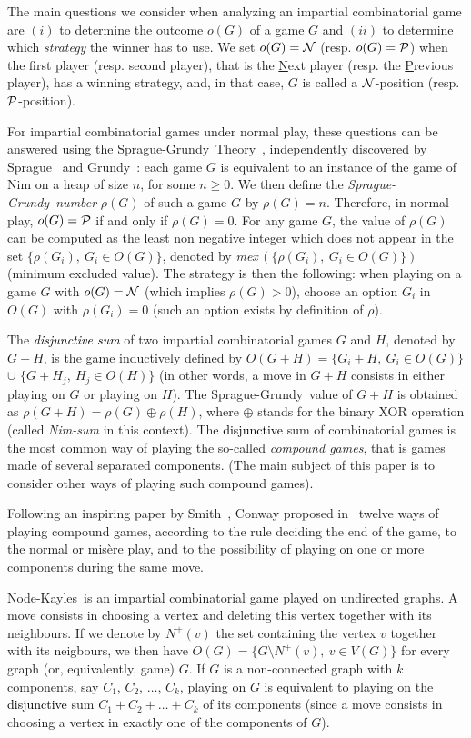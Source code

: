\documentclass[11pt]{article}
\newcommand{\modif}[1]{\textcolor{black}{#1}}
\newcommand{\NK}{Node-Kayles}
\newcommand{\SP}{Sprague-Grundy}
\newcommand{\nimsum}{\oplus}
\newcommand{\NN}{{\cal N}}
\newcommand{\PP}{{\cal P}}
\begin{document}
The main questions we consider when analyzing an impartial combinatorial game are $(i)$
to determine the outcome $o(G)$ of a game $G$ and $(ii)$ to determine which {\em strategy}
the winner has to use. 
We set $o(G)=\NN$ (resp. $o(G)=\PP$) when the first player (resp. second player), that is
the \underline{N}ext player (resp. the \underline{P}revious player), has a
winning strategy, and, in that case, $G$ is called a $\NN$-position
(resp. $\PP$-position).

For impartial combinatorial games under normal play, these questions 
can be answered using the \SP\ Theory~\cite{WW,ONAG}, independently discovered by 
Sprague~\cite{SPRAGUE-36} and Grundy~\cite{GRUNDY-39}: 
each game $G$ is equivalent to an instance of the game of Nim
on a heap of size $n$, for some $n\ge 0$. We then define the 
{\em \SP\ number} $\rho(G)$ of such a game $G$ by $\rho(G)=n$.
Therefore, in normal play, $o(G)=\PP$ if and only if $\rho(G)=0$.
For any game $G$, the value of $\rho(G)$ can be computed as the least
non negative integer which does not appear in the set
$\{\rho(G_i),\ G_i\in O(G)\}$, denoted by 
{\it mex\,}$(\{\rho(G_i),\ G_i\in O(G)\})$ (minimum excluded value).
The strategy is then the following: when playing on a game $G$ with
$o(G)=\NN$ (which implies $\rho(G)>0$), choose an option $G_i$ in
$O(G)$ with $\rho(G_i)=0$ (such an option exists by definition of $\rho$).

The \modif{{\em disjunctive sum}} of two impartial combinatorial games $G$ and
$H$, denoted by $G+H$, is the game inductively defined by
$O(G+H)=\{G_i+H,\ G_i\in O(G)\}$ $\cup$ $\{G+H_j,\ H_j\in O(H)\}$
(in other words, a move in $G+H$ consists in either playing on $G$
or playing on $H$).
The \SP\ value of $G+H$ is obtained as 
$\rho(G+H)=\rho(G)\nimsum\rho(H)$, where $\nimsum$ stands
for the binary XOR operation (called {\em Nim-sum} in this context).
The \modif{disjunctive} sum of combinatorial games
is the most common way of playing the so-called {\em compound games},
that is games made of several separated components. (The main subject
of this paper is to consider other ways of playing such compound games).

Following an inspiring paper by Smith~\cite{SMITH-66},
Conway proposed in~\cite[Chapter~14]{ONAG} twelve ways of playing compound games,
according to the rule deciding the end of the game, to the normal or
mis\`ere play, and to the possibility of playing on one or more components
during the same move.

\NK\ is an impartial combinatorial game played on
undirected graphs. A move consists 
in choosing a vertex and deleting this vertex
together with its neighbours. 
If we denote by $N^+(v)$ the set containing the vertex $v$ together with
its neigbours, we then have $O(G)=\{G\setminus N^+(v),\ v\in V(G)\}$
for every graph (or, equivalently, game) $G$. 
If $G$ is a non-connected graph with $k$ components, say $C_1$, $C_2$, $\dots$, $C_k$,
playing on $G$ is equivalent to playing on the \modif{disjunctive} sum
$C_1+C_2+\dots +C_k$ of its components (since a move consists in choosing
a vertex in exactly one of the components of $G$).
\end{document}
